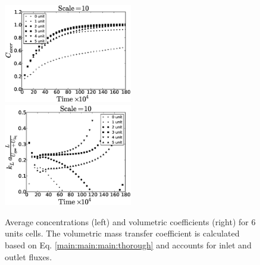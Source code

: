 \documentclass{article}
\begin{document}
\begin{figure}[htb!]
\includegraphics[width=0.5\textwidth]{Figures/aver_units6scale10.eps}\hfill
\includegraphics[width=0.5\textwidth]{Figures/right_def_6scale10.eps}\\
\caption{Average concentrations (left) and volumetric coefficients (right) for $6$ units cells. The
volumetric
mass transfer coefficient is calculated based on Eq. \ref{main:main:main:thorough} and accounts for inlet
and outlet fluxes. \label{fig:unit:6}}
\end{figure}
\end{document}
